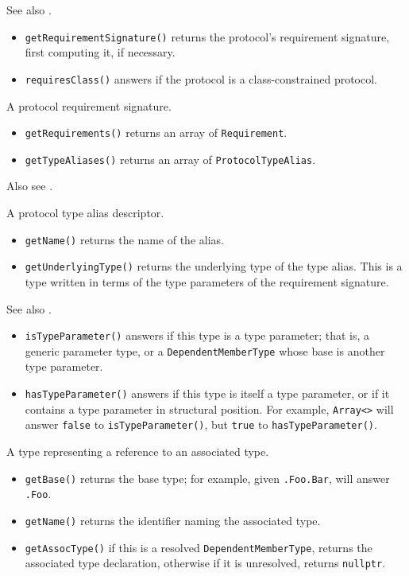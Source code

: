 \documentclass[../generics]{subfiles}
\begin{document}
See also .
\begin{itemize}
\item \texttt{getRequirementSignature()} returns the protocol's requirement signature, first computing it, if necessary.
\item \texttt{requiresClass()} answers if the protocol is a class-constrained protocol.
\end{itemize}

A protocol requirement signature.
\begin{itemize}
\item \texttt{getRequirements()} returns an array of \texttt{Requirement}.
\item \texttt{getTypeAliases()} returns an array of \texttt{ProtocolTypeAlias}.
\end{itemize}
Also see .

A protocol type alias descriptor.
\begin{itemize}
\item \texttt{getName()} returns the name of the alias.
\item \texttt{getUnderlyingType()} returns the underlying type of the type alias. This is a type written in terms of the type parameters of the requirement signature.
\end{itemize}

See also .
\begin{itemize}
\item \texttt{isTypeParameter()} answers if this type is a type parameter; that is, a generic parameter type, or a \texttt{DependentMemberType} whose base is another type parameter.
\item \texttt{hasTypeParameter()} answers if this type is itself a type parameter, or if it contains a type parameter in structural position. For example, \texttt{Array<>} will answer \texttt{false} to \texttt{isTypeParameter()}, but \texttt{true} to \texttt{hasTypeParameter()}. 
\end{itemize}

A type representing a reference to an associated type.
\begin{itemize}
\item \texttt{getBase()} returns the base type; for example, given \texttt{.Foo.Bar}, will answer \texttt{.Foo}.
\item \texttt{getName()} returns the identifier naming the associated type.
\item \texttt{getAssocType()} if this is a resolved \texttt{DependentMemberType}, returns the associated type declaration, otherwise if it is unresolved, returns \texttt{nullptr}.
\end{itemize}
\end{document}
